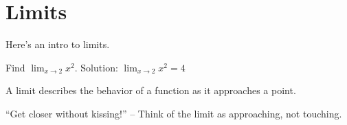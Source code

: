 \documentclass[11pt]{article}
\begin{document}
\section*{Limits}

Here's an intro to limits.

\begin{examplebox}
Find \( \lim_{x \to 2} x^2 \).  
Solution: \( \lim_{x \to 2} x^2 = 4 \)
\end{examplebox}

\begin{keynotebox}
A limit describes the behavior of a function as it approaches a point.
\end{keynotebox}

\begin{funbox}
“Get closer without kissing!” – Think of the limit as approaching, not touching.
\end{funbox}
\end{document}
